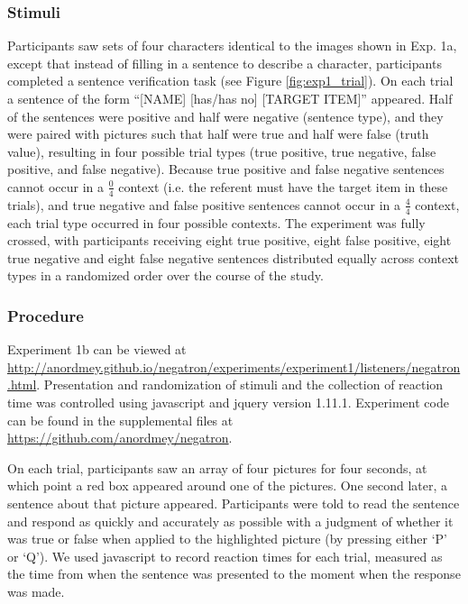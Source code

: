 \documentclass[man, floatsintext, noapacite]{apa6}
\begin{document}
\subsubsection{Stimuli}

Participants saw sets of four characters identical to the images shown in Exp. 1a, except that instead of filling in a sentence to describe a character, participants completed a sentence verification task (see Figure \ref{fig:exp1_trial}). On each trial a sentence of the form ``[NAME] [has/has no] [TARGET ITEM]'' appeared.  Half of the sentences were positive and half were negative (sentence type), and they were paired with pictures such that half were true and half were false (truth value), resulting in four possible trial types (true positive, true negative, false positive, and false negative).  Because true positive and false negative sentences cannot occur in a $\frac{0}{4}$ context (i.e. the referent must have the target item in these trials), and true negative and false positive sentences cannot occur in a $\frac{4}{4}$ context, each trial type occurred in four possible contexts.  The experiment was fully crossed, with participants receiving eight true positive, eight false positive, eight true negative and eight false negative sentences distributed equally across context types in a randomized order over the course of the study.  

\subsubsection{Procedure}

Experiment 1b can be viewed at \url{http://anordmey.github.io/negatron/experiments/experiment1/listeners/negatron.html}. Presentation and randomization of stimuli and the collection of reaction time was controlled using javascript and jquery version 1.11.1. Experiment code can be found in the supplemental files at  \url{https://github.com/anordmey/negatron}.

On each trial, participants saw an array of four pictures for four seconds, at which point a red box appeared around one of the pictures. One second later, a sentence about that picture appeared. Participants were told to read the sentence and respond as quickly and accurately as possible with a judgment of whether it was true or false when applied to the highlighted picture (by pressing either `P' or `Q').  We used javascript to record reaction times for each trial, measured as the time from when the sentence was presented to the moment when the response was made.
\end{document}
